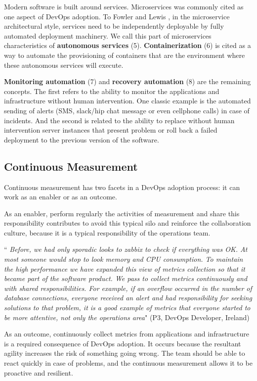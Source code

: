 Modern software is built around services. Microservices  was commonly cited
as one aspect of DevOps adoption. To Fowler and Lewis
\cite{martinfowler2014microservices}, in the
microservice architectural style, services need to be independently deployable
by fully automated deployment machinery. We call this part of microservices
characteristics of \textbf{autonomous services} (5). \textbf{Containerization}
(6) is cited as a way to automate the provisioning of containers that are the
environment where these autonomous services will execute.

\textbf{Monitoring automation} (7) and \textbf{recovery automation} (8) are the
remaining concepts. The first refers to the ability to monitor the
applications and infrastructure without human intervention. One classic example
is the automated sending of alerts (SMS, slack/hip chat message or even
cellphone calls) in case of incidents. And the second is related to the ability
to replace without human intervention server instances that present problem or
roll back a failed deployment to the previous version of the software.


\subsection{Continuous Measurement}
Continuous measurement has two facets in a DevOps adoption process: it can work
as an enabler or as an outcome.

As an enabler, perform regularly the activities of measurement and share this
responsibility contributes to avoid this typical silo and reinforce the
collaboration culture, because it is a typical responsibility of the operations
team.

\begin{mq}
``\emph{
Before, we had only sporadic looks to zabbix to check if everything was OK.
At most someone would stop to look memory and CPU consumption. To maintain the
high performance we have expanded this view of metrics collection so that it
became part of the software product. We pass to collect metrics continuously
and with shared responsibilities. For example, if an overflow occurred in the
number of database connections, everyone received an alert and had
responsibility for seeking solutions to that problem, it is a good example of
metrics that everyone started to be more attentive, not only the operations
area}" (P3, DevOps Developer, Ireland)
\end{mq}

As an outcome, continuously collect metrics from applications and
infrastructure is a required consequence of DevOps adoption. It occurs because
the resultant agility increases the risk of something going wrong. The team
should be able to react quickly in case of problems, and the continuous
measurement allows it to be proactive and resilient.

